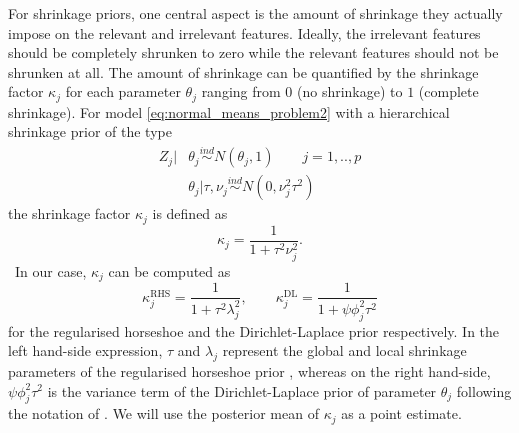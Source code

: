 \documentclass[american,]{article}
\theoremstyle{definition}
\begin{document}
For shrinkage priors, one central aspect is the amount of shrinkage they actually impose on the relevant and irrelevant features. Ideally, the irrelevant features should be completely shrunken to zero while the relevant features should not be shrunken at all. The amount of shrinkage can be quantified by the shrinkage factor $\kappa_{j}$ for each parameter $\theta_{j}$ ranging from $0$ (no shrinkage) to $1$ (complete shrinkage). For model \eqref{eq:normal_means_problem2} with a hierarchical shrinkage prior of the type
\begin{align}
Z_{j}|&\theta_{j}\overset{ind}{\sim}N(\theta_{j},1) \qquad j=1,..,p \\
&\theta_{j}|\tau,\nu_{j}\overset{ind}{\sim}N(0,\nu_{j}^{2}\tau^{2})
\end{align}
the shrinkage factor $\kappa_{j}$ is defined as
\begin{equation}
\kappa_{j}=\frac{1}{1+\tau^{2}\nu_{j}^{2}}.
\end{equation}
\
In our case, $\kappa_{j}$ can be computed as
\begin{equation}
\kappa_{j}^{\text{RHS}}=\frac{1}{1+\tau^{2}\lambda_{j}^{2}}, \qquad \kappa_{j}^{\text{DL}}=\frac{1}{1+\psi\phi_{j}^{2}\tau^{2}}
\end{equation}
for the regularised horseshoe and the Dirichlet-Laplace prior respectively. In the left hand-side expression, $\tau$ and $\lambda_{j}$ represent the global and local shrinkage parameters of the regularised horseshoe prior \cite[for further details see][]{paper:rhs}, whereas on the right hand-side, $\psi\phi_{j}^{2}\tau^{2}$ is the variance term of the Dirichlet-Laplace prior of parameter $\theta_{j}$ following the notation of \cite{paper:dirichlet_laplace}. We will use the posterior mean of $\kappa_{j}$ as a point estimate.
\end{document}
